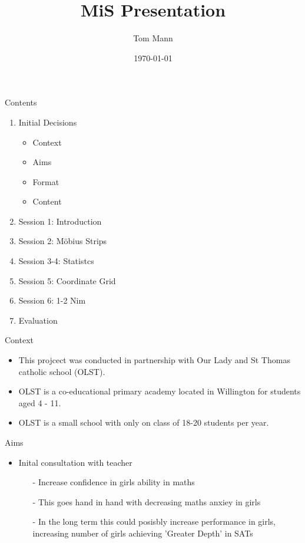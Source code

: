\documentclass{beamer}  %
\title{MiS Presentation}
\author{Tom Mann}
\date{\today}
\begin{document}
\begin{frame}
    \titlepage
\end{frame}

\begin{frame}{Contents}
    
    
    \begin{enumerate}
        \item Initial Decisions
        \begin{itemize}
            \item Context
            \item Aims
            \item Format
            \item Content
        \end{itemize}
        \item Session 1: Introduction
        \item Session 2: M\"{o}bius Strips
        \item Session 3-4: Statistcs
        \item Session 5: Coordinate Grid
        \item Session 6: 1-2 Nim
        \item Evaluation
    \end{enumerate}
\end{frame}

\begin{frame}{Context}
    \begin{itemize}
        \item This projcect was conducted in partnership with Our Lady and St Thomas catholic school (OLST).
        \item OLST is a co-educational primary academy located in Willington for students aged 4 - 11. 
        \item OLST is a small school with only on class of 18-20 students per year.
    \end{itemize}
\end{frame}

\begin{frame}{Aims}
    \begin{itemize}
        \item Inital consultation with teacher
        \begin{itemize}
            \item[-]Increase confidence in girls ability in maths
            \item[-] This goes hand in hand with decreasing maths anxiey in girls
            \item[-] In the long term this could posisbly increase performance in girls, increasing number of girls achieving 'Greater Depth' in SATs
        \end{itemize}
    \end{itemize}
\end{frame}
\end{document}
